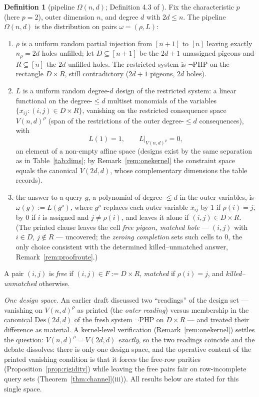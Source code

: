 \documentclass[11pt]{article}
\theoremstyle{definition}
\newtheorem{definition}[theorem]{Definition}
\theoremstyle{remark}
\newcommand{\Des}{\mathrm{Des}}
\begin{document}
\begin{definition}[pipeline $\Omega(n,d)$; Definition 4.3 of
\cite{Kra26}]\label{def:pipeline}
Fix the characteristic $p$ (here $p=2$), outer dimension $n$, and degree
$d$ with $2d\le n$.  The pipeline $\Omega(n,d)$ is the distribution on
pairs $\omega=(\rho,L)$:
\begin{enumerate}
\item $\rho$ is a uniform random partial injection from $[n+1]$ to $[n]$
leaving exactly $n_\rho=2d$ holes unfilled; let $D\subseteq[n+1]$ be the
$2d+1$ unassigned pigeons and $R\subseteq[n]$ the $2d$ unfilled holes.
The restricted system is $\neg\mathrm{PHP}$ on the rectangle $D\times R$,
still contradictory ($2d+1$ pigeons, $2d$ holes).
\item $L$ is a uniform random degree-$d$ design of the restricted
system: a linear functional on the degree-$\le d$ multiset monomials of
the variables $\{x_{ij}:(i,j)\in D\times R\}$, vanishing on the
restricted consequence space $V(n,d)^{\rho}$ (span of the restrictions
of the outer degree-$\le d$ consequences), with
\[
L(1)=1,\qquad L|_{V(n,d)^{\rho}}=0 ,
\]
an element of a non-empty affine space (designs exist by the same
separation as in Table~\ref{tab:dims}; by Remark~\ref{rem:onekernel}
the constraint space equals the canonical $V(2d,d)$, whose
complementary dimensions the table records).
\item the answer to a query $g$, a polynomial of degree $\le d$ in the
outer variables, is $\omega(g):=L(g^\rho)$, where $g^\rho$ replaces each
outer variable $x_{ij}$ by $1$ if $\rho(i)=j$, by $0$ if $i$ is assigned
and $j\ne\rho(i)$, and leaves it alone if $(i,j)\in D\times R$.  (The
printed clause leaves the cell \emph{free pigeon, matched hole} ---
$(i,j)$ with $i\in D$, $j\notin R$ --- uncovered; the \emph{zeroing
completion} sets such cells to $0$, the only choice consistent with the
determined killed--unmatched answer, Remark~\ref{rem:proofroute}.)
\end{enumerate}
A pair $(i,j)$ is \emph{free} if $(i,j)\in F:=D\times R$, \emph{matched}
if $\rho(i)=j$, and \emph{killed--unmatched} otherwise.

\emph{One design space.}  An earlier draft discussed two ``readings''
of the design set --- vanishing on $V(n,d)^{\rho}$ as printed (the
\emph{outer reading}) versus membership in the canonical $\Des(2d,d)$
of the fresh system $\neg\mathrm{PHP}$ on $D\times R$ --- and treated
their difference as material.  A kernel-level verification
(Remark~\ref{rem:onekernel}) settles the question:
$V(n,d)^{\rho}=V(2d,d)$ \emph{exactly}, so the two readings coincide
and the debate dissolves: there is only one design space, and the
operative content of the printed vanishing condition is that it forces
the free-row parities (Proposition~\ref{prop:rigidity}) while leaving
the free pairs fair on row-incomplete query sets
(Theorem~\ref{thm:channel}(iii)).  All results below are stated for
this single space.
\end{definition}
\end{document}
